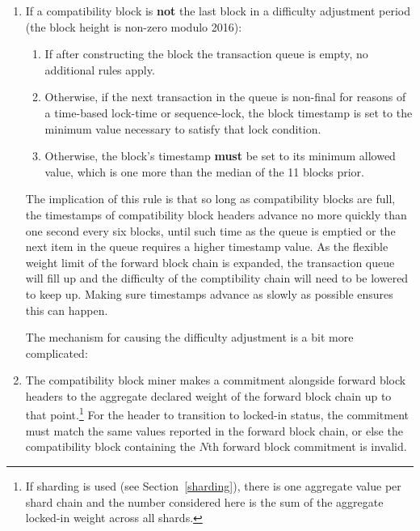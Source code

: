 \begin{enumerate}
\begin{enumerate}

  \item

    If a compatibility block is \textbf{not} the last block in a
    difficulty adjustment period (the block height is non-zero
    modulo \num{2016}):

    \begin{enumerate}

      \item

        If after constructing the block the transaction queue is
        empty, no additional rules apply.

      \item

        Otherwise, if the next transaction in the queue is non-final
        for reasons of a time-based lock-time or sequence-lock, the
        block timestamp is set to the minimum value necessary to
        satisfy that lock condition.

      \item

        Otherwise, the block's timestamp \textbf{must} be set to its
        minimum allowed value, which is one more than the median of
        the \num{11} blocks prior.

    \end{enumerate}


The implication of this rule is that so long as compatibility blocks
are full, the timestamps of compatibility block headers advance no
more quickly than one second every six blocks, until such time as the
queue is emptied or the next item in the queue requires a higher
timestamp value.  As the flexible weight limit of the forward block
chain is expanded, the transaction queue will fill up and the
difficulty of the comptibility chain will need to be lowered to keep
up.  Making sure timestamps advance as slowly as possible ensures this
can happen.

The mechanism for causing the difficulty adjustment is a bit more
complicated:


  \item

    The compatibility block miner makes a commitment alongside forward
    block headers to the aggregate declared weight of the forward
    block chain up to that point.\footnote{If sharding is used (see
    Section~\ref{sharding}), there is one aggregate value per shard
    chain and the number considered here is the sum of the aggregate
    locked-in weight across all shards.}  For the header to transition
    to locked-in status, the commitment must match the same values
    reported in the forward block chain, or else the compatibility
    block containing the $N$th forward block commitment is invalid.


\end{enumerate}
\end{enumerate}
